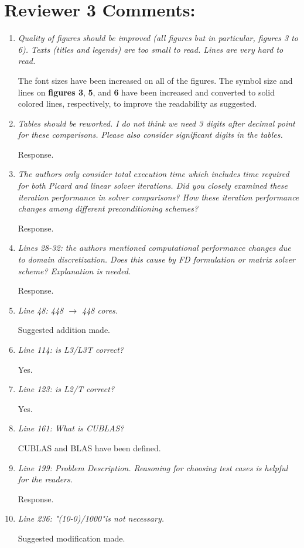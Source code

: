 \documentclass[12pt]{article} %
\begin{document}
\section*{Reviewer 3 Comments:}
\begin{enumerate}
\item \textit{Quality of figures should be improved (all figures but in particular, figures 3 to 6). Texts (titles and legends) are too small to read. Lines are very hard to read.} 

The font sizes have been increased on all of the figures. The symbol size and lines on \textbf{figures 3}, \textbf{5}, and \textbf{6} have been increased and converted to solid colored lines, respectively, to improve the readability as suggested.

\item \textit{Tables should be reworked. I do not think we need 3 digits after decimal point for these comparisons. Please also consider significant digits in the tables.} 

Response. 

\item \textit{The authors only consider total execution time which includes time required for both Picard and linear solver iterations. Did you closely examined these iteration performance in solver comparisons? How these iteration performance changes among different preconditioning schemes? } 

Response.

\item \textit{Lines 28-32: the authors mentioned computational performance changes due to domain discretization. Does this cause by FD formulation or matrix solver scheme? Explanation is needed. } 

Response.

\item \textit{Line 48: 448 $\rightarrow$ 448 cores. } 

Suggested addition made.

\item \textit{Line 114: is L3/L3T correct? } 

Yes.

\item \textit{Line 123: is L2/T correct? } 

Yes.

\item \textit{Line 161: What is CUBLAS? } 

CUBLAS and BLAS have been defined.

\item \textit{Line 199: Problem Description. Reasoning for choosing test cases is helpful for the readers. } 

Response.

\item \textit{Line 236: "(10-0)/1000"is not necessary.} 

Suggested modification made.

\end{enumerate}
\end{document}
